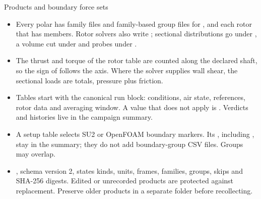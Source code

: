 \begin{frame}{Products and boundary force sets}
\begin{itemize}\small
  \item Every polar has family files and family-based group files for
        ,  and each rotor that has members.
        Rotor solvers also write ; sectional distributions
        go under , a volume cut under
         and probes under .
  \item The thrust and torque of the rotor table are counted along the
        declared shaft, so the sign of  follows the axis. Where the
        solver supplies wall shear, the sectional loads are totals, pressure
        plus friction.
  \item Tables start with the canonical run block: conditions, air state,
        references, rotor data and averaging window. A value that does not
        apply is . Verdicts and histories live in the campaign summary.
  \item A setup \code{[groups]} table selects SU2 or OpenFOAM boundary markers.
        Its , including , stay in the summary;
        they do not add boundary-group CSV files. Groups may overlap.
  \item {}, schema version 2, states kinds, units, frames,
        families, groups, skips and SHA-256 digests. Edited or unrecorded
        products are protected against replacement. Preserve older products
        in a separate folder before recollecting.
\end{itemize}
\end{frame}

